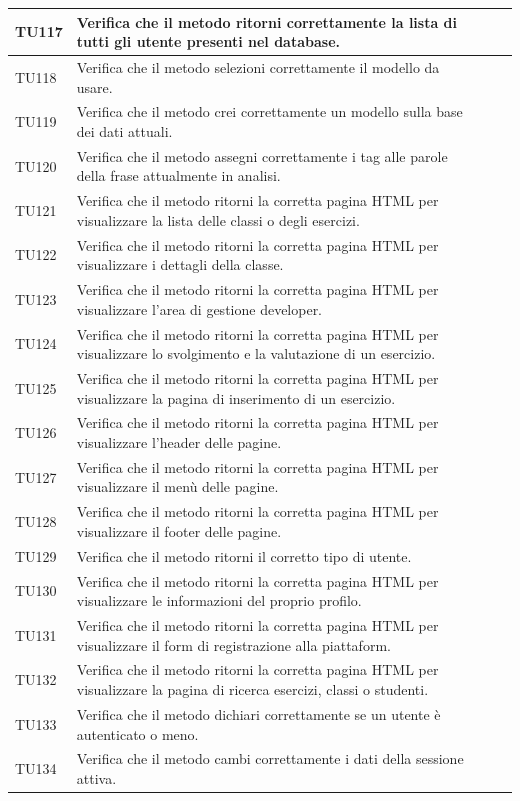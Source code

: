 \begin{longtable}{|>{\centering\arraybackslash}m{1.6cm}|>{\centering\arraybackslash}m{6.41cm}|>{\centering\arraybackslash}m{3.1cm}| c |}
		\rowcolor{LightGray}
		TU117 & Verifica che il metodo ritorni correttamente la lista di tutti gli utente presenti nel database.  \\ \hline
		TU118 & Verifica che il metodo selezioni correttamente il modello da usare.  \\ \hline
		\rowcolor{LightGray}
		TU119 & Verifica che il metodo crei correttamente un modello sulla base dei dati attuali.  \\ \hline
		TU120 & Verifica che il metodo assegni correttamente i tag alle parole della frase attualmente in analisi.  \\ \hline
		\rowcolor{LightGray}
		TU121 & Verifica che il metodo ritorni la corretta pagina HTML per visualizzare la lista delle classi o degli esercizi. \\ \hline
		TU122 & Verifica che il metodo ritorni la corretta pagina HTML per visualizzare i dettagli della classe. \\ \hline
		\rowcolor{LightGray}
		TU123 & Verifica che il metodo ritorni la corretta pagina HTML per visualizzare l'area di gestione developer. \\ \hline
		TU124 & Verifica che il metodo ritorni la corretta pagina HTML per visualizzare lo svolgimento e la valutazione di un esercizio. \\ \hline
		\rowcolor{LightGray}
		TU125 & Verifica che il metodo ritorni la corretta pagina HTML per visualizzare la pagina di inserimento di un esercizio. \\ \hline
		TU126 & Verifica che il metodo ritorni la corretta pagina HTML per visualizzare l'header delle pagine. \\ \hline
		\rowcolor{LightGray}
		TU127 & Verifica che il metodo ritorni la corretta pagina HTML per visualizzare il menù delle pagine. \\ \hline
		TU128 & Verifica che il metodo ritorni la corretta pagina HTML per visualizzare il footer delle pagine. \\ \hline
		\rowcolor{LightGray}
		TU129 & Verifica che il metodo ritorni il corretto tipo di utente. \\ \hline
		TU130 & Verifica che il metodo ritorni la corretta pagina HTML per visualizzare le informazioni del proprio profilo. \\ \hline
		\rowcolor{LightGray}
		TU131 & Verifica che il metodo ritorni la corretta pagina HTML per visualizzare il form di registrazione alla piattaform. \\ \hline
		TU132 & Verifica che il metodo ritorni la corretta pagina HTML per visualizzare la pagina di ricerca esercizi, classi o studenti. \\ \hline
		\rowcolor{LightGray}
		TU133 & Verifica che il metodo dichiari correttamente se un utente è autenticato o meno.  \\ \hline
		TU134 & Verifica che il metodo cambi correttamente i dati della sessione attiva.  \\ \hline
		

\end{longtable}
